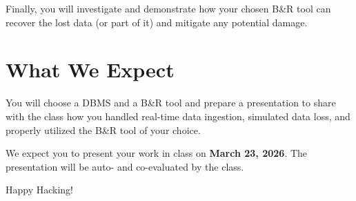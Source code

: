 \documentclass{article}
\begin{document}
Finally, you will investigate and demonstrate how your chosen B\&R tool can recover the lost data (or part of it) and mitigate any potential damage.

\section{What We Expect}
You will choose a DBMS and a B\&R tool and prepare a presentation to share with the class how you handled real-time data ingestion, simulated data loss, and properly utilized the B\&R tool of your choice.

We expect you to present your work in class on \textbf{March 23, 2026}. The presentation will be auto- and co-evaluated by the class.

\vspace{5mm}
Happy Hacking! 
\end{document}
